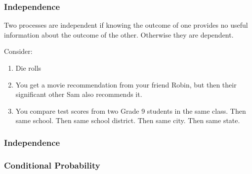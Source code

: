 \documentclass[handout]{beamer}
\newcommand{\blue}[1]{\textcolor{blue2}{#1}}
\begin{document}
\begin{frame}
\frametitle{Independence}
Two processes are \blue{independent} if knowing the outcome of one provides no useful information about the outcome of the other.  Otherwise they are dependent.

\vspace{0.5cm}
Consider:
\begin{enumerate}
\pause \item Die rolls
\pause \item You get a movie recommendation from your friend Robin, but then their significant other Sam also recommends it.  
\pause \item You compare test scores from two Grade 9 students in the same class.  \pause Then same school.  \pause Then same school district.  \pause Then same city.  \pause Then same state.
\end{enumerate}

\end{frame}


\begin{frame}
\frametitle{Independence}
%
%
%
%

\end{frame}


\begin{frame}
\frametitle{Conditional Probability}
%
%

\end{frame}
\end{document}
